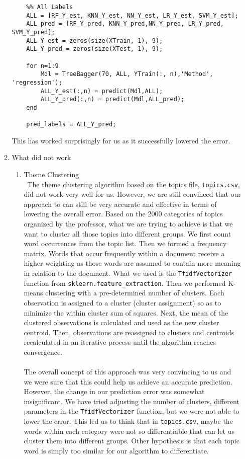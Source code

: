 \documentclass[english]{article}
\begin{document}
\begin{enumerate}
\begin{enumerate}
        \begin{verbatim}
    %% All Labels
    ALL = [RF_Y_est, KNN_Y_est, NN_Y_est, LR_Y_est, SVM_Y_est];
    ALL_pred = [RF_Y_pred, KNN_Y_pred,NN_Y_pred, LR_Y_pred, SVM_Y_pred];
    ALL_Y_est = zeros(size(XTrain, 1), 9);
    ALL_Y_pred = zeros(size(XTest, 1), 9);

    for n=1:9
        Mdl = TreeBagger(70, ALL, YTrain(:, n),'Method', 'regression'); 
        ALL_Y_est(:,n) = predict(Mdl,ALL);
        ALL_Y_pred(:,n) = predict(Mdl,ALL_pred);
    end

    pred_labels = ALL_Y_pred;
        \end{verbatim}
        This has worked surprisingly for us as it successfully lowered the error.
        \item What did not work
        \begin{enumerate}
        \item Theme Clustering\\\
        The theme clustering algorithm based on the topics file, \texttt{topics.csv}, did not work very well for us. However, we are still convinced that our approach to can still be very accurate and effective in terms of lowering the overall error. Based on the 2000 categories of topics organized by the professor, what we are trying to achieve is that we want to cluster all those topics into different groups. We first count word occurrences from the topic list. Then we formed a frequency matrix. Words that occur frequently within a document receive a higher weighting as those words are assumed to contain more meaning in relation to the document. What we used is the \texttt{TfidfVectorizer} function from \texttt{sklearn.feature\_extraction}. Then we performed K-means clustering with a pre-determined number of clusters. Each observation is assigned to a cluster (cluster assignment) so as to minimize the within cluster sum of squares. Next, the mean of the clustered observations is calculated and used as the new cluster centroid. Then, observations are reassigned to clusters and centroids recalculated in an iterative process until the algorithm reaches convergence.\\\\
        The overall concept of this approach was very convincing to us and we were sure that this could help us achieve an accurate prediction. However, the change in our prediction error was somewhat insignificant. We have tried adjusting the number of clusters, different parameters in the \texttt{TfidfVectorizer} function, but we were not able to lower the error. This led us to think that in \texttt{topics.csv}, maybe the words within each category were not so differentiable that can let us cluster them into different groups. Other hypothesis is that each topic word is simply too similar for our algorithm to differentiate.\\

\end{enumerate}
\end{enumerate}
\end{enumerate}
\end{document}

